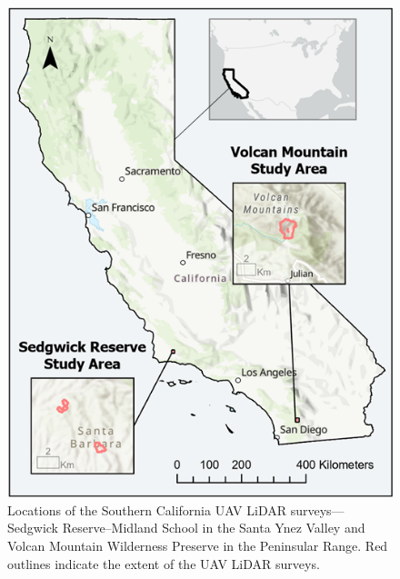 \documentclass[remotesensing,article,accept,pdftex,moreauthors]{Definitions/mdpi}
\renewcommand{\hl}[1]{#1}
\begin{document}
\begin{figure}[H]
  \includegraphics[width=0.75\linewidth]{figures/Overall_Study_Areas_v2.png}
    \caption{\hl{Locations} %
 of the Southern California UAV LiDAR surveys—Sedgwick Reserve–Midland School in the Santa Ynez Valley and Volcan Mountain Wilderness Preserve in the Peninsular Range. Red outlines indicate the extent of the UAV LiDAR surveys.}
  \label{fig:overall_study_area}
\end{figure}
\vspace{-9pt}
\end{document}
